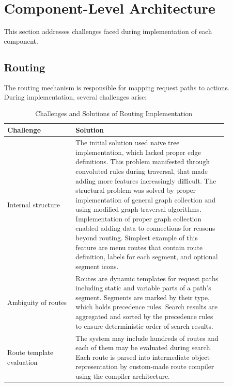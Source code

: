 \section{Component-Level Architecture}\label{sec:component-architecture}
This section addresses challenges faced during implementation of each component.



\subsection{Routing}\label{subsec:routing}
The routing mechanism is responsible for mapping request paths to actions.
During implementation, several challenges arise:

\begin{table}[H]
    \centering
    \begin{tabular}{|p{0.28\linewidth}|p{0.62\linewidth}|}
        \hline
        \textbf{Challenge} & \textbf{Solution} \\
        \hline
        Internal structure
        &
        The initial solution used naive tree implementation, which lacked proper edge definitions.
        This problem manifested through convoluted rules during traversal, that made adding more features increasingly difficult.
        The structural problem was solved by proper implementation of general graph collection and using modified graph
        traversal algorithms.
        Implementation of proper graph collection enabled adding data to connections for reasons beyond routing.
        Simplest example of this feature are menu routes that contain route definition, labels for each segment, and optional segment icons. \\
        \hline
        Ambiguity of routes
        &
        Routes are dynamic templates for request paths including static and variable parts of a path's segment.
        Segments are marked by their type, which holds precedence rules.
        Search results are aggregated and sorted by the precedence rules to ensure deterministic order of search results. \\
        \hline
        Route template evaluation
        &
        The system may include hundreds of routes and each of them may be evaluated during search.
        Each route is parsed into intermediate object representation by custom-made route compiler using the compiler architecture. \\
        \hline
    \end{tabular}
    \caption{Challenges and Solutions of Routing Implementation}
    \label{tab:csRouting}
\end{table}

